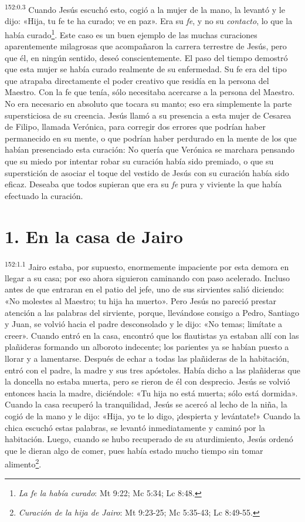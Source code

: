 \par
\textsuperscript{152:0.3} Cuando Jesús escuchó esto, cogió a la mujer de la mano, la levantó y le dijo: «Hija, tu fe te ha curado; ve en paz». Era su \textit{fe}, y no su \textit{contacto}, lo que la había curado\footnote{\textit{La fe la había curado}: Mt 9:22; Mc 5:34; Lc 8:48.}. Este caso es un buen ejemplo de las muchas curaciones aparentemente milagrosas que acompañaron la carrera terrestre de Jesús, pero que él, en ningún sentido, deseó conscientemente. El paso del tiempo demostró que esta mujer se había curado realmente de su enfermedad. Su fe era del tipo que atrapaba directamente el poder creativo que residía en la persona del Maestro. Con la fe que tenía, sólo necesitaba acercarse a la persona del Maestro. No era necesario en absoluto que tocara su manto; eso era simplemente la parte supersticiosa de su creencia. Jesús llamó a su presencia a esta mujer de Cesarea de Filipo, llamada Verónica, para corregir dos errores que podrían haber permanecido en su mente, o que podrían haber perdurado en la mente de los que habían presenciado esta curación: No quería que Verónica se marchara pensando que su miedo por intentar robar su curación había sido premiado, o que su superstición de asociar el toque del vestido de Jesús con su curación había sido eficaz. Deseaba que todos supieran que era su \textit{fe} pura y viviente la que había efectuado la curación.

\section*{1. En la casa de Jairo}
\par
\textsuperscript{152:1.1} Jairo estaba, por supuesto, enormemente impaciente por esta demora en llegar a su casa; por eso ahora siguieron caminando con paso acelerado. Incluso antes de que entraran en el patio del jefe, uno de sus sirvientes salió diciendo: «No molestes al Maestro; tu hija ha muerto». Pero Jesús no pareció prestar atención a las palabras del sirviente, porque, llevándose consigo a Pedro, Santiago y Juan, se volvió hacia el padre desconsolado y le dijo: «No temas; limítate a creer». Cuando entró en la casa, encontró que los flautistas ya estaban allí con las plañideras formando un alboroto indecente; los parientes ya se habían puesto a llorar y a lamentarse. Después de echar a todas las plañideras de la habitación, entró con el padre, la madre y sus tres apóstoles. Había dicho a las plañideras que la doncella no estaba muerta, pero se rieron de él con desprecio. Jesús se volvió entonces hacia la madre, diciéndole: «Tu hija no está muerta; sólo está dormida». Cuando la casa recuperó la tranquilidad, Jesús se acercó al lecho de la niña, la cogió de la mano y le dijo: «Hija, yo te lo digo, ¡despierta y levántate!» Cuando la chica escuchó estas palabras, se levantó inmediatamente y caminó por la habitación. Luego, cuando se hubo recuperado de su aturdimiento, Jesús ordenó que le dieran algo de comer, pues había estado mucho tiempo sin tomar alimento\footnote{\textit{Curación de la hija de Jairo}: Mt 9:23-25; Mc 5:35-43; Lc 8:49-55.}.

